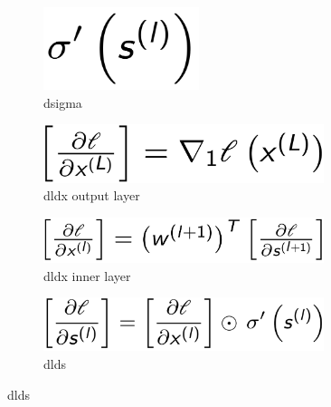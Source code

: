 \begin{figure}[H]
	\begin{minipage}{0.15\textwidth} 
		\begin{figure}[H]
			\includegraphics[width=0.5\textwidth]{Images/disgma.png}
			\centering
			\caption{dsigma}
			\centering
		\end{figure}
	\end{minipage} 
	\begin{minipage}{0.25\textwidth} 
		\begin{figure}[H]
			\includegraphics[width=0.9\textwidth]{Images/dldx_fin.png}
			\centering
			\caption{dldx output layer}
			\centering
		\end{figure}
	\end{minipage}
	\begin{minipage}{0.25\textwidth} 
		\begin{figure}[H]
			\includegraphics[width=0.9\textwidth]{Images/dldx_in.png}
			\centering
			\caption{dldx inner layer}
			\centering
		\end{figure}
	\end{minipage} 
	\begin{minipage}{0.25\textwidth} 
		\begin{figure}[H]
			\includegraphics[width=0.9\textwidth]{Images/dlds.png}
			\centering
			\caption{dlds}
			\centering
		\end{figure}
	\end{minipage}
	\centering
\end{figure}

